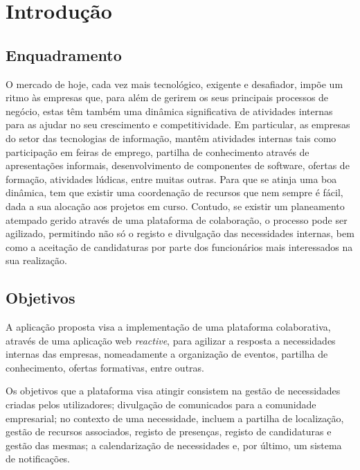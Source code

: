 \chapter{Introdução}\label{sec:intro}

\section{Enquadramento}\label{sec:enquadramento}
O mercado de hoje, cada vez mais tecnológico, exigente e desafiador, impõe um ritmo às empresas que, para
além de gerirem os seus principais processos de negócio, estas têm também uma dinâmica significativa de
atividades internas para as ajudar no seu crescimento e competitividade. Em particular, as empresas do setor
das tecnologias de informação, mantêm atividades internas tais como participação em feiras de emprego,
partilha de conhecimento através de apresentações informais, desenvolvimento de componentes de software,
ofertas de formação, atividades lúdicas, entre muitas outras. Para que se atinja uma boa dinâmica, tem que existir uma coordenação de
recursos que nem sempre é fácil, dada a sua alocação aos projetos em curso. Contudo, se existir um
planeamento atempado gerido através de uma plataforma de colaboração, o processo pode ser agilizado,
permitindo não só o registo e divulgação das necessidades internas, bem como a aceitação de candidaturas por
parte dos funcionários mais interessados na sua realização.

\section{Objetivos}\label{sec:objectivos}
A aplicação proposta visa a implementação de uma plataforma colaborativa, através de uma aplicação web \textit{reactive}, para agilizar a resposta a necessidades internas das empresas, nomeadamente a
organização de eventos, partilha de conhecimento, ofertas formativas, entre outras. 
\par

Os objetivos que a plataforma visa atingir consistem na gestão de necessidades criadas pelos utilizadores;
divulgação de comunicados para a comunidade empresarial;
no contexto de uma necessidade, incluem a partilha de localização, 
gestão de recursos associados, registo de presenças, registo de candidaturas e gestão das mesmas; 
a calendarização de necessidades e, por último, um sistema de notificações.

\newpage

